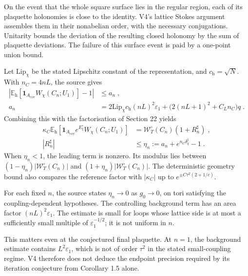 \documentclass[11pt,a4paper]{article}
\newcommand{\id}{\mathbf 1}
\newcommand{\Eh}{\mathbb E_{\mathrm h}}
\begin{document}
On the event that the whole square surface lies in the regular region, each of its plaquette holonomies is close to the identity. V4's lattice Stokes argument assembles them in their nonabelian order, with the necessary conjugations. Unitarity bounds the deviation of the resulting closed holonomy by the sum of plaquette deviations. The failure of this surface event is paid by a one-point union bound.

Let $\mathrm{Lip}_\chi$ be the stated Lipschitz constant of the representation, and $c_{\mathrm h}=\sqrt N$. With $n_C=4nL$, the source gives
\begin{equation*}
    \begin{aligned}
        \left|\Eh[\id_{A_{\mathrm{cov}}}W_\chi(C_n;U_1)]-1\right|
        &\leqslant  a_n\;,\\
        a_n&=2\mathrm{Lip}_\chi c_{\mathrm h}(nL)^2\varepsilon_1
            +\bigl(2(nL+1)^2+C_Ln_C\bigr)q\;.
    \end{aligned}
\end{equation*}
Combining this with the factorisation of Section 22 yields
\begin{equation*}
    \begin{aligned}
        \kappa_C\Eh[\id_{A_{\mathrm{cov}}}e^{E^\circ_\xi}W_\chi(C_n;U_1)]
            &=\mathcal W_T^\circ(C_n)(1+R_n^\sharp)\;,\\
        |R_n^\sharp|&\leqslant  \eta_n
            :=a_n+e^{n_C\delta^\sharp_q}-1\;.
    \end{aligned}
\end{equation*}
When $\eta_n<1$, the leading term is nonzero. Its modulus lies between $(1-\eta_n)|\mathcal W_T^\circ(C_n)|$ and $(1+\eta_n)|\mathcal W_T^\circ(C_n)|$. The deterministic geometry bound also compares the reference factor with $|\kappa_C|$ up to $e^{\pm C\tau^2(2+1/c)}$.

For each fixed $n$, the source states $\eta_n\to0$ as $g_0\to0$, on tori satisfying the coupling-dependent hypotheses. The controlling background term has an area factor $(nL)^2\varepsilon_1$. The estimate is small for loops whose lattice side is at most a sufficiently small multiple of $\varepsilon_1^{-1/2}$; it is not uniform in $n$.

This matters even at the conjectured final plaquette. At $n=1$, the background estimate contains $L^2\varepsilon_1$, which is not of order $\tau^2$ in the stated small-coupling regime. V4 therefore does not deduce the endpoint precision required by its iteration conjecture from Corollary 1.5 alone.
\end{document}
